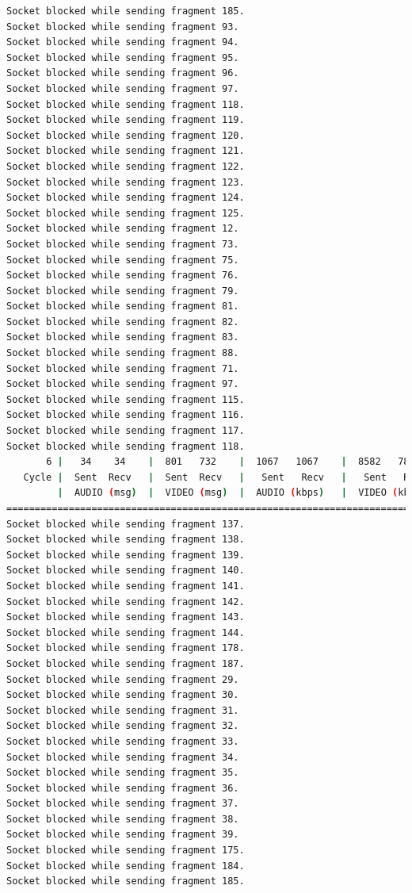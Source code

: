 \begin{lstlisting}[language=bash,basicstyle=\ttfamily\tiny]
Socket blocked while sending fragment 185.
Socket blocked while sending fragment 93.
Socket blocked while sending fragment 94.
Socket blocked while sending fragment 95.
Socket blocked while sending fragment 96.
Socket blocked while sending fragment 97.
Socket blocked while sending fragment 118.
Socket blocked while sending fragment 119.
Socket blocked while sending fragment 120.
Socket blocked while sending fragment 121.
Socket blocked while sending fragment 122.
Socket blocked while sending fragment 123.
Socket blocked while sending fragment 124.
Socket blocked while sending fragment 125.
Socket blocked while sending fragment 12.
Socket blocked while sending fragment 73.
Socket blocked while sending fragment 75.
Socket blocked while sending fragment 76.
Socket blocked while sending fragment 79.
Socket blocked while sending fragment 81.
Socket blocked while sending fragment 82.
Socket blocked while sending fragment 83.
Socket blocked while sending fragment 88.
Socket blocked while sending fragment 71.
Socket blocked while sending fragment 97.
Socket blocked while sending fragment 115.
Socket blocked while sending fragment 116.
Socket blocked while sending fragment 117.
Socket blocked while sending fragment 118.
       6 |   34    34    |  801   732    |  1067   1067    |  8582   7842    |  24     73       
   Cycle |  Sent  Recv   |  Sent  Recv   |   Sent   Recv   |   Sent   Recv   | Program System
         |  AUDIO (msg)  |  VIDEO (msg)  |  AUDIO (kbps)   |  VIDEO (kbps)   |     CPU (%) 
===========================================================================================
Socket blocked while sending fragment 137.
Socket blocked while sending fragment 138.
Socket blocked while sending fragment 139.
Socket blocked while sending fragment 140.
Socket blocked while sending fragment 141.
Socket blocked while sending fragment 142.
Socket blocked while sending fragment 143.
Socket blocked while sending fragment 144.
Socket blocked while sending fragment 178.
Socket blocked while sending fragment 187.
Socket blocked while sending fragment 29.
Socket blocked while sending fragment 30.
Socket blocked while sending fragment 31.
Socket blocked while sending fragment 32.
Socket blocked while sending fragment 33.
Socket blocked while sending fragment 34.
Socket blocked while sending fragment 35.
Socket blocked while sending fragment 36.
Socket blocked while sending fragment 37.
Socket blocked while sending fragment 38.
Socket blocked while sending fragment 39.
Socket blocked while sending fragment 175.
Socket blocked while sending fragment 184.
Socket blocked while sending fragment 185.

\end{lstlisting}
